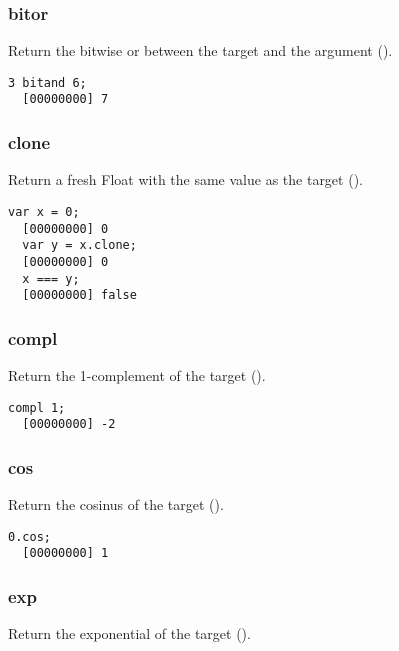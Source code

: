 \subsubsection{bitor}

Return the bitwise or between the target and the argument ().

\begin{lstlisting}[caption=Float.bitor, label=lst:float-bitor,
  float=\floatposh]
  3 bitand 6;
  [00000000] 7
\end{lstlisting}

\subsubsection{clone}

Return a fresh Float with the same value as the target ().

\begin{lstlisting}[caption=Float.clone, label=lst:float-clone,
  float=\floatposh]
  var x = 0;
  [00000000] 0
  var y = x.clone;
  [00000000] 0
  x === y;
  [00000000] false
\end{lstlisting}

\subsubsection{compl}

Return the 1-complement of the target ().

\begin{lstlisting}[caption=Float.compl, label=lst:float-compl,
  float=\floatposh]
  compl 1;
  [00000000] -2
\end{lstlisting}

\subsubsection{cos}

Return the cosinus of the target ().

\begin{lstlisting}[caption=Float.cos, label=lst:float-cos,
  float=\floatposh]
  0.cos;
  [00000000] 1
\end{lstlisting}

\subsubsection{exp}

Return the exponential of the target ().


